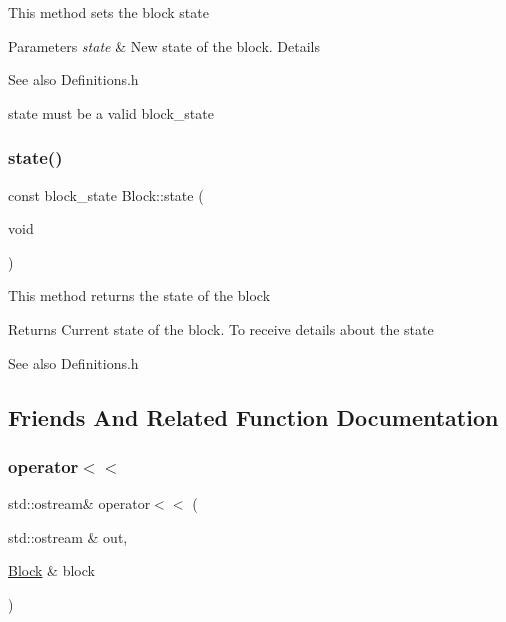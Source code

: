 This method sets the block state


\begin{DoxyParams}{Parameters}
{\em state} & New state of the block. Details \\
\hline
\end{DoxyParams}
\begin{DoxySeeAlso}{See also}
Definitions.\+h
\end{DoxySeeAlso}
state must be a valid block\+\_\+state \mbox{\label{classcore_1_1logic_1_1_block_a0a84f5b5c790173d5f3ed4db2f33535b}} 
\subsubsection{\texorpdfstring{state()}{state()}}
{\footnotesize\ttfamily const block\+\_\+state Block\+::state (\begin{DoxyParamCaption}\item[{void}]{ }\end{DoxyParamCaption})}

This method returns the state of the block

\begin{DoxyReturn}{Returns}
Current state of the block. To receive details about the state 
\end{DoxyReturn}
\begin{DoxySeeAlso}{See also}
Definitions.\+h 
\end{DoxySeeAlso}


\subsection{Friends And Related Function Documentation}
\mbox{\label{classcore_1_1logic_1_1_block_a822a522e43e47d065d5c56a2103e08a3}} 
\subsubsection{\texorpdfstring{operator$<$$<$}{operator<<}}
{\footnotesize\ttfamily std\+::ostream\& operator$<$$<$ (\begin{DoxyParamCaption}\item[{std\+::ostream \&}]{out,  }\item[{\mbox{\hyperlink{classcore_1_1logic_1_1_block}{Block}} \&}]{block }\end{DoxyParamCaption})\hspace{0.3cm}{\ttfamily [friend]}}

